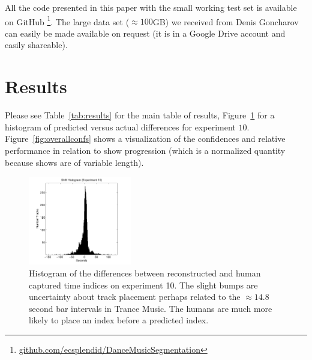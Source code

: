 \documentclass[twocolumn]{article}
\begin{document}
All the code presented in this paper with the small working test set is available on GitHub \footnote{\url{github.com/ecsplendid/DanceMusicSegmentation}}. The large data set ($\approx100$GB) we received from Denis Goncharov can easily be made available on request (it is in a Google Drive account and easily shareable).

\section{Results}\label{sec:results}

Please see Table~\ref{tab:results} for the main table of results, Figure~\ref{fig:shifthistogram} for a histogram of predicted versus actual differences for experiment $10$. Figure~\ref{fig:overallconfs} shows a visualization of the confidences and relative performance in relation to show progression (which is a normalized quantity because shows are of variable length).

	\begin{figure}
		\centering
		\includegraphics[width=0.4\textwidth]{images/shift_histogram}
		\caption{Histogram of the differences between reconstructed and human captured time indices on experiment 10. The slight bumps are uncertainty about track placement perhaps related to the $\approx 14.8$ second bar intervals in Trance Music. The humans are much more likely to place an index before a predicted index.  }
		\label{fig:shifthistogram}
	\end{figure} 
\end{document}

